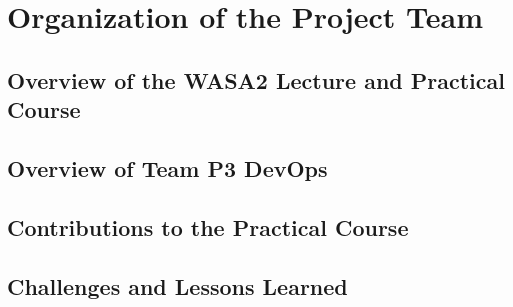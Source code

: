 \chapter{Organization of the Project Team}
\label{cha:projektteam-arbeiten}


\section{Overview of the WASA2 Lecture and Practical Course}


\section{Overview of Team P3 DevOps}


\section{Contributions to the Practical Course}


\section{Challenges and Lessons Learned}

